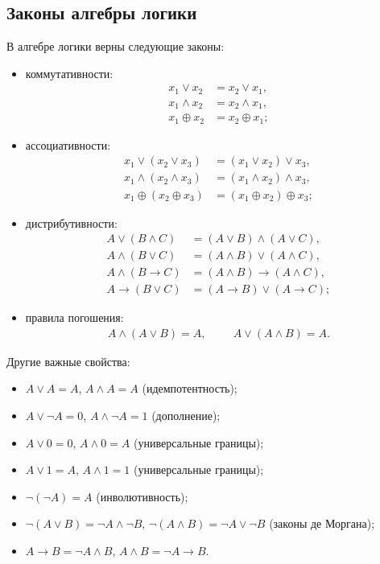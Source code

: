 \subsection{Законы алгебры логики}
В алгебре логики верны следующие законы:
\begin{itemize}
    \item коммутативности:
    \begin{align*}
        x_1 \lor x_2 &= x_2 \lor x_1,\\
        x_1 \land x_2 &= x_2 \land x_1,\\
        x_1 \oplus x_2 &= x_2 \oplus x_1;
    \end{align*}
    \item ассоциативности:
    \begin{align*}
        x_1 \lor(x_2 \lor x_3) &= (x_1 \lor x_2) \lor x_3,\\
        x_1 \land (x_2 \land x_3) &= (x_1\land x_2) \land x_3,\\
        x_1 \oplus (x_2 \oplus x_3) &= (x_1 \oplus x_2) \oplus x_3;
    \end{align*}
    \item дистрибутивности:
    \begin{align*}
        A \lor (B\land C) &= (A\lor B) \land (A\lor C),\\
        A \land (B\lor C) &= (A\land B) \lor (A\land C),\\
        A\land (B\to C) &= (A\land B) \to (A\land C),\\
        A\to (B\lor C) &= (A\to B)\lor(A\to C);
    \end{align*}
    \item правила погошения:
    \begin{align*}
        A \land (A\lor B) = A, \hspace{1cm} A\lor (A\land B) = A.
    \end{align*}
\end{itemize}

Другие важные свойства:
\begin{itemize}
    \item $A\lor A = A$, $A\land A = A$ (идемпотентность);
    \item $A\lor \neg A = 0$, $A\land \neg A = 1$ (дополнение);
    \item $A\lor 0 = 0$, $A\land 0 = A$ (универсальные границы);
    \item $A\lor 1 = A$, $A\land 1 = 1$ (универсальные границы);
    \item $\neg(\neg A) = A$ (инволютивность);
    \item $\neg(A\lor B) = \neg A \land \neg B$, $\neg(A\land B) = \neg A\lor \neg B$ (законы де Моргана);
    \item $A\to B = \neg A \land B$, $A\land B = \neg A\to B$.
\end{itemize}

